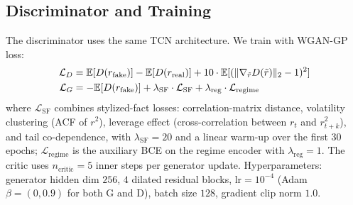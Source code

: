 \subsection{Discriminator and Training}

The discriminator uses the same TCN architecture. We train with WGAN-GP loss:
\begin{align}
    \mathcal{L}_D &= \mathbb{E}[D(r_{\text{fake}})] - \mathbb{E}[D(r_{\text{real}})] + 10 \cdot \mathbb{E}[(\|\nabla_{\tilde r} D(\tilde r)\|_2 - 1)^2] \\
    \mathcal{L}_G &= -\mathbb{E}[D(r_{\text{fake}})] + \lambda_{\text{SF}} \cdot \mathcal{L}_{\text{SF}} + \lambda_\text{reg}\cdot\mathcal{L}_\text{regime}
\end{align}
where $\mathcal{L}_{\text{SF}}$ combines stylized-fact losses: correlation-matrix distance, volatility clustering (ACF of $r^2$), leverage effect (cross-correlation between $r_t$ and $r^2_{t+k}$), and tail co-dependence, with $\lambda_{\text{SF}}=20$ and a linear warm-up over the first $30$ epochs; $\mathcal{L}_\text{regime}$ is the auxiliary BCE on the regime encoder with $\lambda_\text{reg}=1$. The critic uses $n_{\text{critic}}=5$ inner steps per generator update. Hyperparameters: generator hidden dim $256$, $4$ dilated residual blocks, $\text{lr}=10^{-4}$ (Adam $\beta=(0,0.9)$ for both G and D), batch size $128$, gradient clip norm $1.0$.
